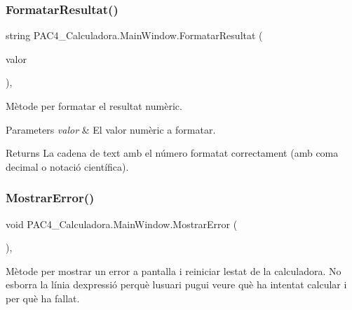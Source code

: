 \subsubsection{\texorpdfstring{Formatar\+Resultat()}{FormatarResultat()}}
{\footnotesize\ttfamily string P\+A\+C4\+\_\+\+Calculadora.\+Main\+Window.\+Formatar\+Resultat (\begin{DoxyParamCaption}\item[{double}]{valor }\end{DoxyParamCaption})\hspace{0.3cm}{\ttfamily [inline]}, {\ttfamily [private]}}



Mètode per formatar el resultat numèric. 


\begin{DoxyParams}{Parameters}
{\em valor} & El valor numèric a formatar.\\
\hline
\end{DoxyParams}
\begin{DoxyReturn}{Returns}
La cadena de text amb el número formatat correctament (amb coma decimal o notació científica).
\end{DoxyReturn}
\mbox{\label{class_p_a_c4___calculadora_1_1_main_window_a0c53c4846653c6a7f127f4582d0cf449}} 
\subsubsection{\texorpdfstring{Mostrar\+Error()}{MostrarError()}}
{\footnotesize\ttfamily void P\+A\+C4\+\_\+\+Calculadora.\+Main\+Window.\+Mostrar\+Error (\begin{DoxyParamCaption}{ }\end{DoxyParamCaption})\hspace{0.3cm}{\ttfamily [inline]}, {\ttfamily [private]}}



Mètode per mostrar un error a pantalla i reiniciar l\textquotesingle{}estat de la calculadora. No esborra la línia d\textquotesingle{}expressió perquè l\textquotesingle{}usuari pugui veure què ha intentat calcular i per què ha fallat. 

\mbox{\label{class_p_a_c4___calculadora_1_1_main_window_a514f2c027009dbf5f19ddba53e03f751}} 
